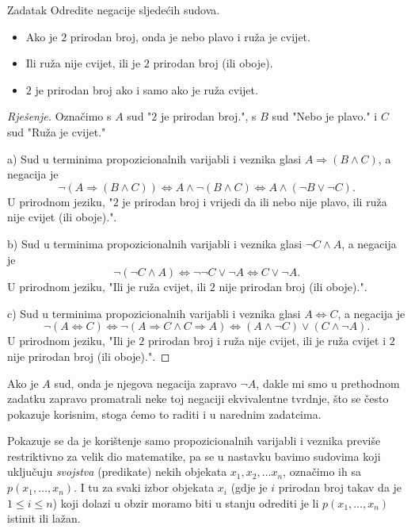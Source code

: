 \begin{exercise}{Zadatak} Odredite negacije sljedećih sudova.
\begin{itemize}
\item[a)] Ako je $2$ prirodan broj, onda je nebo plavo i ruža je cvijet.
\item[b)] Ili ruža nije cvijet, ili je $2$ prirodan broj (ili oboje).
\item[c)] $2$ je prirodan broj ako i samo ako je ruža cvijet. 
\end{itemize}
\end{exercise}
\begin{proof}[Rješenje]
Označimo s $A$ sud "$2$ je prirodan broj.", s $B$ sud "Nebo je plavo." i $C$ sud "Ruža je cvijet."

a) Sud u terminima propozicionalnih varijabli i veznika glasi $A\Rightarrow (B\wedge C)$, a negacija je
$$\neg\left( A\Rightarrow (B\wedge C)\right)\Leftrightarrow A\wedge \neg (B\wedge C)\Leftrightarrow A\wedge (\neg B\vee \neg C).$$
U prirodnom jeziku, "$2$ je prirodan broj i vrijedi da ili nebo nije plavo, ili ruža nije cvijet (ili oboje).".

b) Sud u terminima propozicionalnih varijabli i veznika glasi $\neg C\wedge A$, a negacija je
$$\neg\left(\neg C\wedge A\right)\Leftrightarrow \neg\neg C\vee \neg A\Leftrightarrow C\vee \neg A.$$
U prirodnom jeziku, "Ili je ruža cvijet, ili $2$ nije prirodan broj (ili oboje).".

c) Sud u terminima propozicionalnih varijabli i veznika glasi $A\Leftrightarrow C$, a negacija je
$$\neg\left(A\Leftrightarrow C\right)\Leftrightarrow \neg\left(A\Rightarrow C \wedge C\Rightarrow A\right) \Leftrightarrow (A\wedge \neg C)\vee (C\wedge \neg A).$$
U prirodnom jeziku, "Ili je $2$ prirodan broj i ruža nije cvijet, ili je ruža cvijet i $2$ nije prirodan broj (ili oboje).".
\end{proof}
\begin{remark}
Ako je $A$ sud, onda je njegova negacija zapravo $\neg A$, dakle mi smo u prethodnom zadatku zapravo promatrali neke toj negaciji ekvivalentne tvrdnje, što se često pokazuje korisnim, stoga ćemo to raditi i u narednim zadatcima.
\end{remark}
Pokazuje se da je korištenje samo propozicionalnih varijabli i veznika previše restriktivno za velik dio matematike, pa se u nastavku bavimo sudovima koji uključuju \textit{svojstva} (predikate) nekih objekata \(x_1, x_2,\dots x_n\), označimo ih sa \(p(x_1, \dots, x_n)\). I tu za svaki izbor objekata \(x_i\) (gdje je \(i\) prirodan broj takav da je \(1\leq i\leq n\)) koji dolazi u obzir moramo biti u stanju odrediti je li \(p(x_1, \dots, x_n)\) istinit ili lažan. 
